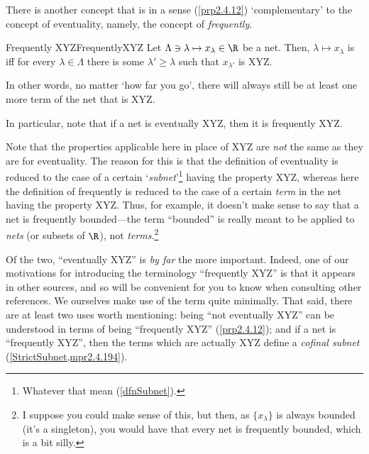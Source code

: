 There is another concept that is in a sense (\cref{prp2.4.12}) `complementary' to the concept of eventuality, namely, the concept of \emph{frequently}.
\begin{mdf}{Frequently XYZ}{FrequentlyXYZ}
Let $\Lambda \ni \lambda \mapsto x_{\lambda}\in \R$ be a net.  Then, $\lambda \mapsto x_{\lambda}$ is  iff for every $\lambda \in \Lambda$ there is some $\lambda '\geq \lambda$ such that $x_{\lambda '}$ is XYZ.
\begin{rmk}
In other words, no matter `how far you go', there will always still be at least one more term of the net that is XYZ.
\end{rmk}
\begin{rmk}
In particular, note that if a net is eventually XYZ, then it is frequently XYZ.
\end{rmk}
\begin{rmk}
Note that the properties applicable here in place of XYZ are \emph{not} the same as they are for eventuality.  The reason for this is that the definition of eventuality is reduced to the case of a certain `\emph{subnet}'\footnote{Whatever that mean (\cref{dfnSubnet}).} having the property XYZ, whereas here the definition of frequently is reduced to the case of a certain \emph{term} in the net having the property XYZ.  Thus, for example, it doesn't make sense to say that a net is frequently bounded---the term ``bounded'' is really meant to be applied to \emph{nets} (or subsets of $\R$), not \emph{terms}.\footnote{I suppose you could make sense of this, but then, as $\{ x_{\lambda}\}$ is always bounded (it's a singleton), you would have that every net is frequently bounded, which is a bit silly.}
\end{rmk}
\begin{rmk}
Of the two, ``eventually XYZ'' is \emph{by far} the more important.  Indeed, one of our motivations for introducing the terminology ``frequently XYZ'' is that it appears in other sources, and so will be convenient for you to know when consulting other references.  We ourselves make use of the term quite minimally.  That said, there are at least two uses worth mentioning:  being ``not eventually XYZ'' can be understood in terms of being ``frequently XYZ'' (\cref{prp2.4.12}); and if a net is ``frequently XYZ'', then the terms which are actually XYZ define a \emph{cofinal subnet} (\cref{StrictSubnet,mpr2.4.194}).
\end{rmk}
\end{mdf}

